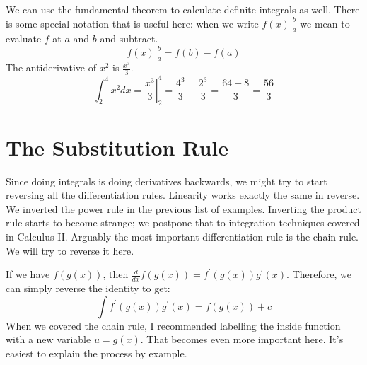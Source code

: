 \documentclass[fleqn]{report}
\begin{document}
\begin{example}
We can use the fundamental theorem to
calculate definite integrals as well. There is some special notation
that is useful here: when we write $\left. f(x)
\right|_a^b$ we mean to evaluate $f$ at $a$ and $b$ and
subtract. 
\begin{equation*}
\left. f(x) \right|_a^b = f(b) - f(a)
\end{equation*}
The antiderivative of $x^2$ is $\frac{x^3}{3}$.
\begin{equation*}
\int_2^4 x^2 dx = \left. \frac{x^3}{3} \right|_2^4 =
\frac{4^3}{3} - \frac{2^3}{3} = \frac{64 - 8}{3} = \frac{56}{3}
\end{equation*}
\end{example}

\section{The Substitution Rule}
\label{substitution-rule}

Since doing integrals is doing derivatives backwards, we might
try to start reversing all the differentiation rules.
Linearity works exactly the same in reverse.
We inverted the power rule in the previous list of
examples. Inverting the product rule starts to become
strange; we postpone that to integration techniques covered in
Calculus II. Arguably the most important differentiation rule is
the chain rule. We will try to reverse it here.

If we have $f(g(x))$, then $\frac{d}{dx} f(g(x)) =
f^\prime(g(x)) g^\prime(x)$. Therefore, we can simply reverse
the identity to get: 
\begin{equation*}
\int f^\prime(g(x)) g^\prime(x) = f(g(x)) + c
\end{equation*}
When we covered the chain rule, I recommended labelling the inside
function with a new variable $u = g(x)$. That becomes even
more important here. It's easiest to explain the process by
example.
\end{document}
